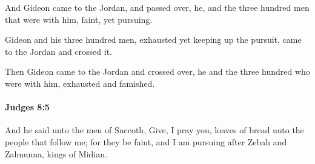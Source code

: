 			\begin{versebox}
					\item[BHS] 
					\item[ASV] And Gideon came to the Jordan, and passed over, he, and the three hundred men that were with him, faint, yet pursuing.
					\item[NIV] Gideon and his three hundred men, exhausted yet keeping up the pursuit, came to the Jordan and crossed it.
					\item[NRSV] Then Gideon came to the Jordan and crossed over, he and the three hundred who were with him, exhausted and famished.
			\end{versebox}

		\paragraph{Judges 8:5} %
			\label{JUDGES-8-5}

			And he said unto the men of Succoth, Give, I pray you, loaves of bread unto the people that follow me; for they be faint, and I am pursuing after Zebah and Zalmunna, kings of Midian.

